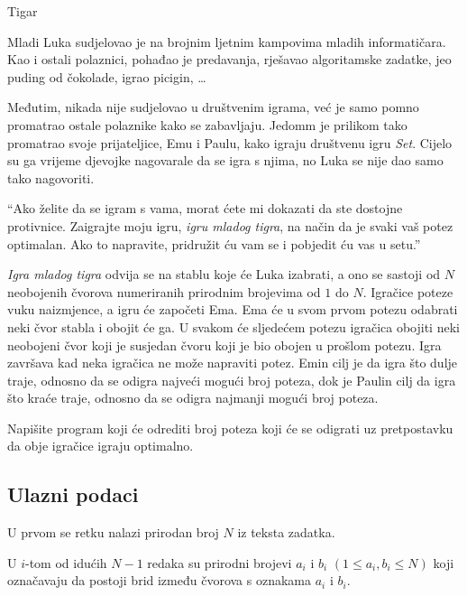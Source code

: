 \begin{statement}[
  problempoints=100,
  timelimit=3 sekunde,
  memorylimit=512 MiB,
]{Tigar}

Mladi Luka sudjelovao je na brojnim ljetnim kampovima mladih informatičara.
Kao i ostali polaznici, pohađao je predavanja, rješavao algoritamske zadatke,
jeo puding od čokolade, igrao picigin, \ldots

Međutim, nikada nije sudjelovao u društvenim igrama, već je samo pomno
promatrao ostale polaznike kako se zabavljaju. Jedomm je prilikom tako
promatrao svoje prijateljice, Emu i Paulu, kako igraju društvenu igru
\textit{Set}. Cijelo su ga vrijeme djevojke nagovarale da se igra s njima,
no Luka se nije dao samo tako nagovoriti.

``Ako želite da se igram s vama, morat ćete mi dokazati da ste dostojne
  protivnice. Zaigrajte moju igru, \textit{igru mladog tigra}, na način da je
  svaki vaš potez optimalan. Ako to napravite, pridružit ću vam se i pobjedit ću
  vas u setu.''

\textit{Igra mladog tigra} odvija se na stablu koje će Luka izabrati, a ono se
sastoji od $N$ neobojenih čvorova numeriranih prirodnim brojevima od $1$ do
$N$. Igračice poteze vuku naizmjence, a igru će započeti Ema. Ema će u svom
prvom potezu odabrati neki čvor stabla i obojit će ga. U svakom će sljedećem
potezu igračica obojiti neki neobojeni čvor koji je susjedan čvoru koji je
bio obojen u prošlom potezu. Igra završava kad neka igračica ne može
napraviti potez. Emin cilj je da igra što dulje traje, odnosno da se odigra
najveći mogući broj poteza, dok je Paulin cilj da igra što kraće traje,
odnosno da se odigra najmanji mogući broj poteza.

Napišite program koji će odrediti broj poteza koji će se odigrati uz
pretpostavku da obje igračice igraju optimalno.

\subsection*{Ulazni podaci}

U prvom se retku nalazi prirodan broj $N$ iz teksta zadatka.

U $i$-tom od idućih $N - 1$ redaka su prirodni brojevi $a_i$ i $b_i$
$(1 \le a_i, b_i \le N)$ koji označavaju da postoji brid između čvorova
s oznakama $a_i$ i $b_i$.


\end{statement}
